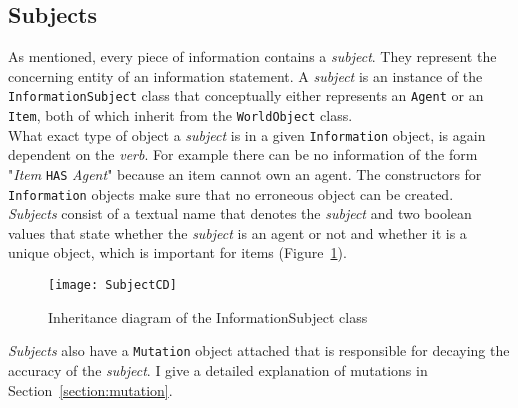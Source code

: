 \subsection{Subjects}
As mentioned, every piece of information contains a \textit{subject}. They represent the concerning entity of an information statement. A \textit{subject} is an instance of the \verb|InformationSubject| class that conceptually either represents an \verb|Agent| or an \verb|Item|, both of which inherit from the \verb|WorldObject| class.\\
What exact type of object a \textit{subject} is in a given \verb|Information| object, is again dependent on the \textit{verb}. For example there can be no information of the form "\textit{Item} \verb|HAS| \textit{Agent}" because an item cannot own an agent. The constructors for \verb|Information| objects make sure that no erroneous object can be created.\\
\textit{Subjects} consist  of a textual name that denotes the \textit{subject} and two boolean values that state whether the \textit{subject} is an agent or not and whether it is a unique object, which is important for items (Figure~\ref{fig:subjectCD}).
\begin{figure}
	\centering
	\texttt{[image: SubjectCD]}
	\caption{Inheritance diagram of the InformationSubject class}
	\label{fig:subjectCD}
\end{figure}
\textit{Subjects} also have a \verb|Mutation| object attached that is responsible for decaying the accuracy of the \textit{subject}. I give a detailed explanation of mutations in Section~\ref{section:mutation}.
